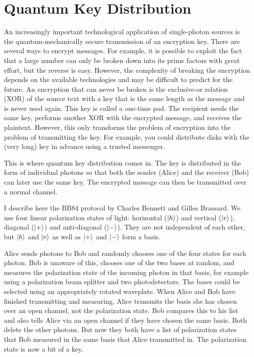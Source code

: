 \section{Quantum Key Distribution}

An increasingly important technological application of single-photon sources is the quantum-mechanically secure transmission of an encryption key. There are several ways to encrypt messages. For example, it is possible to exploit the fact that a large number can only be broken down into its prime factors with great effort, but the reverse is easy. However, the complexity of breaking the encryption depends on the available technologies and may be difficult to predict for the future. An encryption that can never be broken is the exclusive-or relation (XOR) of the source text with a key that is the same length as the message and is never used again. This key is called a one-time pad. The recipient needs the same key, performs another XOR with the encrypted message, and receives the plaintext. However, this only transforms the problem of encryption into the problem of transmitting the key. For example, you could distribute disks with the (very long) key in advance using a trusted messenger.

This is where quantum key distribution comes in. The key is distributed in the form of individual photons so that both the sender (Alice) and the receiver (Bob) can later use the same key. The encrypted message can then be transmitted over a normal channel. 

I describe here the BB84 protocol by Charles Bennett and Gilles Brassard. We use four linear polarization states of light: horizontal ($\ket{h}$) and vertical ($\ket{v}$), diagonal ($\ket{+}$) and anti-diagonal ($\ket{-}$). They are not independent of each other, but $\ket{h}$ and $\ket{v}$ as well as $\ket{+}$ and $\ket{-}$ form a basis.

Alice sends photons to Bob and randomly chooses one of the four states for each photon. Bob is unaware of this, chooses one of the two bases at random, and measures the polarization state of the incoming photon in that basis, for example using a polarization beam splitter and two photodetectors. The bases could be selected using an appropriately rotated waveplate. When Alice and Bob have finished transmitting and measuring, Alice transmits the basis she has chosen over an open channel, not the polarization state. Bob compares this to his list and also tells Alice via an open channel if they have chosen the same basis. Both delete the other photons. But now they both have a list of polarization states that Bob measured in the same basis that Alice transmitted in. The polarization state is now a bit of a key.

